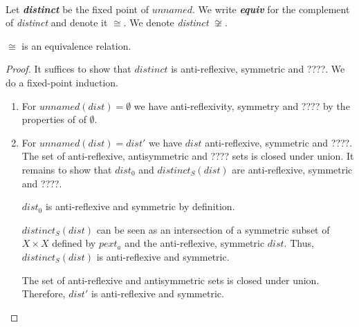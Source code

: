 \paragraph{}
Let \textit{\textbf{distinct}} be the fixed point of $unnamed$. 
We write \textit{\textbf{equiv}} for the complement of \textit{distinct} and denote it $\cong$.
We denote \textit{distinct} $\not\cong$.

\begin{lemma}
    \label{equiv_refl}
    $\cong$ is an equivalence relation.
\end{lemma}
\begin{proof}
    It suffices to show that $\mathit{distinct}$ is anti-reflexive, symmetric and ????.
    We do a fixed-point induction.
    \begin{enumerate}
        \item For $\mathit{unnamed}(\mathit{dist}) = \emptyset$ we have anti-reflexivity, symmetry and ???? 
            by the properties of of $\emptyset$.
        \item For $\mathit{unnamed}(\mathit{dist}) = \mathit{dist'}$ 
            we have $\mathit{dist}$ anti-reflexive, symmetric and ????.
            The set of anti-reflexive, antisymmetric and ???? sets is closed under union.
            It remains to show that
            $\mathit{dist_0}$ 
            and $\mathit{distinct_S}(\mathit{dist})$ 
            are anti-reflexive, symmetric and ????.
            

            $\mathit{dist_0}$ is anti-reflexive and symmetric by definition. 

            $\mathit{distinct_S}(\mathit{dist})$ can be seen as an intersection 
            of a symmetric subset of $X \times X$ defined by $\mathit{pext_a}$ and the anti-reflexive, symmetric $\mathit{dist}$.
            Thus, $\mathit{distinct_S}(\mathit{dist})$ is anti-reflexive and symmetric.
            
            The set of anti-reflexive and antisymmetric sets is closed under union.
            Therefore, $\mathit{dist'}$ is anti-reflexive and symmetric.
    \end{enumerate}
\end{proof}



